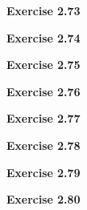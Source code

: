 \documentclass{article}
\begin{document}
\bigskip

\begin{framed}
    \noindent \textbf{Exercise 2.73}
    
    \medskip
    
    
\end{framed}

\bigskip

\begin{framed}
    \noindent \textbf{Exercise 2.74}
    
    \medskip
    
    
\end{framed}

\bigskip

\begin{framed}
    \noindent \textbf{Exercise 2.75}
    
    \medskip
    
    
\end{framed}

\bigskip

\begin{framed}
    \noindent \textbf{Exercise 2.76}
    
    \medskip
    
    
\end{framed}

\bigskip

\begin{framed}
    \noindent \textbf{Exercise 2.77}
    
    \medskip
    
    
\end{framed}

\bigskip

\begin{framed}
    \noindent \textbf{Exercise 2.78}
    
    \medskip
    
    
\end{framed}

\bigskip

\begin{framed}
    \noindent \textbf{Exercise 2.79}
    
    \medskip
    
    
\end{framed}

\bigskip

\begin{framed}
    \noindent \textbf{Exercise 2.80}
    
    \medskip
    
    
\end{framed}
\end{document}
